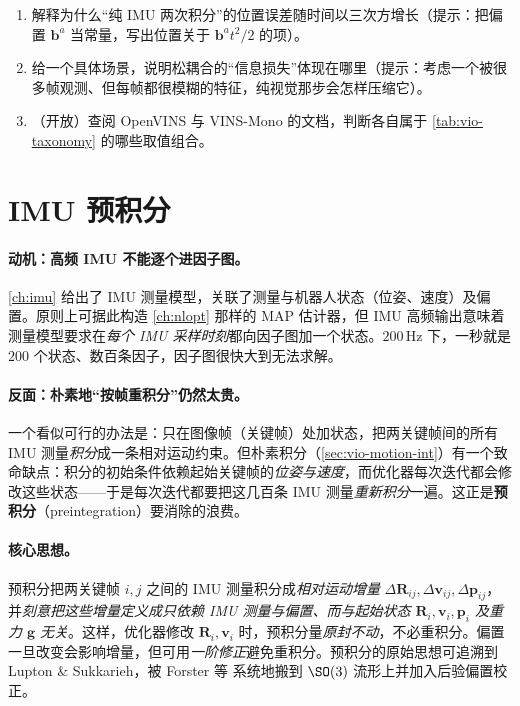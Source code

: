 \begin{practice}
\begin{enumerate}
  \item 解释为什么“纯 IMU 两次积分”的位置误差随时间以三次方增长（提示：把偏置 $\mathbf{b}^a$ 当常量，写出位置关于 $\mathbf{b}^a t^2/2$ 的项）。
  \item 给一个具体场景，说明松耦合的“信息损失”体现在哪里（提示：考虑一个被很多帧观测、但每帧都很模糊的特征，纯视觉那步会怎样压缩它）。
  \item （开放）查阅 OpenVINS 与 VINS-Mono 的文档，判断各自属于 \cref{tab:vio-taxonomy} 的哪些取值组合。
\end{enumerate}
\end{practice}

\section{IMU 预积分}
\label{sec:vio-preint}

\paragraph{动机：高频 IMU 不能逐个进因子图。}
\cref{ch:imu} 给出了 IMU 测量模型，关联了测量与机器人状态（位姿、速度）及偏置。原则上可据此构造 \cref{ch:nlopt} 那样的 MAP 估计器，但 IMU 高频输出意味着测量模型要求在\emph{每个 IMU 采样时刻}都向因子图加一个状态\cite{carlone2026handbook}。$200\,$Hz 下，一秒就是 $200$ 个状态、数百条因子，因子图很快大到无法求解。

\paragraph{反面：朴素地“按帧重积分”仍然太贵。}
一个看似可行的办法是：只在图像帧（关键帧）处加状态，把两关键帧间的所有 IMU 测量\emph{积分}成一条相对运动约束。但朴素积分（\cref{sec:vio-motion-int}）有一个致命缺点：积分的初始条件依赖起始关键帧的\emph{位姿与速度}，而优化器每次迭代都会修改这些状态——于是每次迭代都要把这几百条 IMU 测量\emph{重新积分}一遍\cite{forster2017preintegration}。这正是\textbf{预积分}（preintegration）要消除的浪费。

\paragraph{核心思想。}
预积分把两关键帧 $i,j$ 之间的 IMU 测量积分成\emph{相对运动增量} $\Delta\mathbf{R}_{ij},\Delta\mathbf{v}_{ij},\Delta\mathbf{p}_{ij}$，并\emph{刻意把这些增量定义成只依赖 IMU 测量与偏置、而与起始状态 $\mathbf{R}_i,\mathbf{v}_i,\mathbf{p}_i$ 及重力 $\mathbf{g}$ 无关}。这样，优化器修改 $\mathbf{R}_i,\mathbf{v}_i$ 时，预积分量\emph{原封不动}，不必重积分。偏置一旦改变会影响增量，但可用\emph{一阶修正}避免重积分。预积分的原始思想可追溯到 Lupton \& Sukkarieh\cite{lupton2012visual}，被 Forster 等\cite{forster2017preintegration} 系统地搬到 $\SO(3)$ 流形上并加入后验偏置校正。

